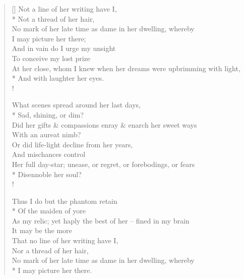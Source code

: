\documentclass[MAIN]{subfiles}
\begin{document}
\settowidth{\versewidth}{At her close, whom I knew when her dreams were upbrimming with light,}
\begin{verse}[\versewidth]
\vin Not a line of her writing have I,\\*
\vin \vin Not a thread of her hair,\\
No mark of her late time as dame in her dwelling, whereby\\
\vin \vin I may picture her there;\\
\vin And in vain do I urge my unsight\\
\vin \vin To conceive my lost prize\\
At her close, whom I knew when her dreams were upbrimming with light,\\*
\vin \vin And with laughter her eyes.\\!

\vin What scenes spread around her last days,\\*
\vin \vin Sad, shining, or dim?\\
Did her gifts \& compassions enray \& enarch her sweet ways\\
\vin \vin With an aureat nimb?\\
\vin Or did life-light decline from her years,\\
\vin \vin And mischances control\\
Her full day-star; unease, or regret, or forebodings, or fears\\*
\vin \vin Disennoble her soul?\\!

\vin Thus I do but the phantom retain\\*
\vin \vin Of the maiden of yore\\
As my relic; yet haply the best of her -- fined in my brain\\
\vin \vin It may be the more\\
\vin That no line of her writing have I,\\
\vin \vin Nor a thread of her hair,\\
No mark of her late time as dame in her dwelling, whereby\\*
\vin \vin I may picture her there.
\end{verse}
\end{document}

